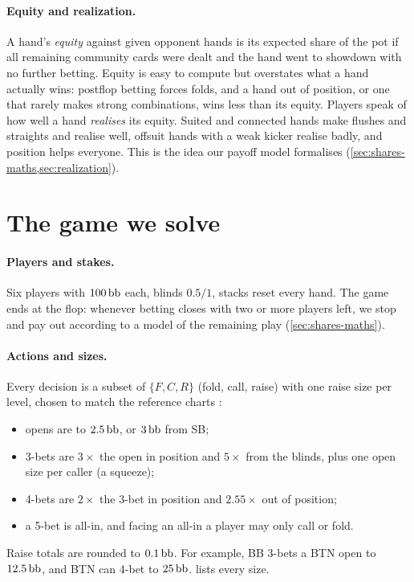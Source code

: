 \paragraph{Equity and realization.} A hand's \emph{equity} against given opponent hands is its expected share of the pot if all remaining community cards were dealt and the hand went to showdown with no further betting. Equity is easy to compute but overstates what a hand actually wins: postflop betting forces folds, and a hand out of position, or one that rarely makes strong combinations, wins less than its equity. Players speak of how well a hand \emph{realises} its equity. Suited and connected hands make flushes and straights and realise well, offsuit hands with a weak kicker realise badly, and position helps everyone. This is the idea our payoff model formalises (\cref{sec:shares-maths,sec:realization}).

\section{The game we solve}\label{sec:intro-game}

\paragraph{Players and stakes.} Six players with $100\,\mathrm{bb}$ each, blinds $0.5/1$, stacks reset every hand. The game ends at the flop: whenever betting closes with two or more players left, we stop and pay out according to a model of the remaining play (\cref{sec:shares-maths}).

\paragraph{Actions and sizes.} Every decision is a subset of $\{F, C, R\}$ (fold, call, raise) with one raise size per level, chosen to match the reference charts \cite{pokertrainer}:
\begin{itemize}
  \item opens are to $2.5\,\mathrm{bb}$, or $3\,\mathrm{bb}$ from SB;
  \item 3-bets are $3\times$ the open in position and $5\times$ from the blinds, plus one open size per caller (a squeeze);
  \item 4-bets are $2\times$ the 3-bet in position and $2.55\times$ out of position;
  \item a 5-bet is all-in, and facing an all-in a player may only call or fold.
\end{itemize}
Raise totals are rounded to $0.1\,\mathrm{bb}$. For example, BB 3-bets a BTN open to $12.5\,\mathrm{bb}$, and BTN can 4-bet to $25\,\mathrm{bb}$.  lists every size.

